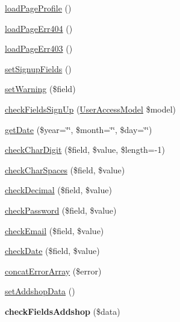 \begin{DoxyCompactItemize}
\item 
\hyperlink{classBasePageController_affa5617be55ed9bf233fd7bd1b2e19c9}{load\+Page\+Profile} ()
\item 
\hyperlink{classBasePageController_a07d3e03b8e2ec5cc698f057a3496c14b}{load\+Page\+Err404} ()
\item 
\hyperlink{classBasePageController_a9ecd03fb676ab32ee9c2cb4e412757cc}{load\+Page\+Err403} ()
\item 
\hyperlink{classBasePageController_a877c4f32b7d39e566f7832aef94c2f11}{set\+Signup\+Fields} ()
\item 
\hyperlink{classBasePageController_a777f34065716ce7f7706ea745fbdd254}{set\+Warning} (\$field)
\item 
\hyperlink{classBasePageController_a56e85dfb915144831cf39435b88774f5}{check\+Fields\+Sign\+Up} (\hyperlink{classUserAccessModel}{User\+Access\+Model} \$model)
\item 
\hyperlink{classBasePageController_a2aaad6f0fa836c9d7e6d9df5974cb4a7}{get\+Date} (\$year=\char`\"{}\char`\"{}, \$month=\char`\"{}\char`\"{}, \$day=\char`\"{}\char`\"{})
\item 
\hyperlink{classBasePageController_ade6dad738c6fce22cf8b44028628090d}{check\+Char\+Digit} (\$field, \$value, \$length=-\/1)
\item 
\hyperlink{classBasePageController_a82b064f99d35b69e42a6a267e28ed04b}{check\+Char\+Spaces} (\$field, \$value)
\item 
\hyperlink{classBasePageController_ad79d970cb91298dfa2206bfe22516618}{check\+Decimal} (\$field, \$value)
\item 
\hyperlink{classBasePageController_a6829b94ed721619b43879475c75b8fc8}{check\+Password} (\$field, \$value)
\item 
\hyperlink{classBasePageController_a5a0788181caf223a4ce208702c93e0c8}{check\+Email} (\$field, \$value)
\item 
\hyperlink{classBasePageController_a6f1a0a900ee8f95b6b6f12c52272a9a7}{check\+Date} (\$field, \$value)
\item 
\hyperlink{classBasePageController_ac0083ad81bbac88f3ca4bdf258566a07}{concat\+Error\+Array} (\$error)
\item 
\hyperlink{classBasePageController_a153a1dcf2e23be9499f8083828671c26}{set\+Addshop\+Data} ()
\item 
\hypertarget{classBasePageController_aa71c4d8a5aa7b90d2074e511fe4ddcc2}{{\bfseries check\+Fields\+Addshop} (\$data)}\label{classBasePageController_aa71c4d8a5aa7b90d2074e511fe4ddcc2}

\end{DoxyCompactItemize}
